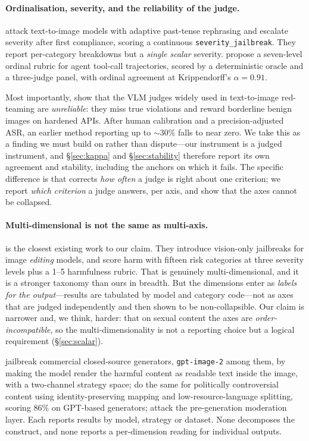 \documentclass[11pt]{article}
\begin{document}
\paragraph{Ordinalisation, severity, and the reliability of the judge.}
\citet{past2harm} attack text-to-image models with adaptive past-tense
rephrasing and escalate severity after first compliance, scoring a continuous
\texttt{severity\_jailbreak}. They report per-category breakdowns but a
\emph{single scalar} severity. \citet{actiongraded} propose a seven-level
ordinal rubric for agent tool-call trajectories, scored by a deterministic
oracle and a three-judge panel, with ordinal agreement at Krippendorff's
$\alpha=0.91$.

Most importantly, \citet{rise} show that the VLM judges widely used in
text-to-image red-teaming are \emph{unreliable}: they miss true violations and
reward borderline benign images on hardened APIs. After human calibration and
a precision-adjusted ASR, an earlier method reporting up to ${\sim}30\%$ falls
to near zero. We take this as a finding we must build on rather than
dispute---our instrument is a judged instrument, and \S\ref{sec:kappa} and
\S\ref{sec:stability} therefore report its own agreement and stability,
including the anchors on which it fails. The specific difference is that
\citet{rise} corrects \emph{how often} a judge is right about one criterion;
we report \emph{which criterion} a judge answers, per axis, and show that the
axes cannot be collapsed.

\paragraph{Multi-dimensional is not the same as multi-axis.}
\citet{visualjailbreak} is the closest existing work to our claim.
They introduce vision-only jailbreaks for image \emph{editing} models, and
score harm with fifteen risk categories at three severity levels plus a
1--5 harmfulness rubric. That is genuinely multi-dimensional, and it is a
stronger taxonomy than ours in breadth. But the dimensions enter as
\emph{labels for the output}---results are tabulated by model and category
code---not as axes that are judged independently and then shown to be
non-collapsible. Our claim is narrower and, we think, harder: that on sexual
content the axes are \emph{order-incompatible}, so the multi-dimensionality is
not a reporting choice but a logical requirement (\S\ref{sec:scalar}).

\citet{typo} jailbreak commercial closed-source generators, \texttt{gpt-image-2}
among them, by making the model render the harmful content as readable text
inside the image, with a two-channel strategy space; \citet{pc2} do the same
for politically controversial content using identity-preserving mapping and
low-resource-language splitting, scoring 86\% on GPT-based generators;
\citet{mirage} attack the pre-generation moderation layer. Each reports
results by model, strategy or dataset. None decomposes the construct, and none
reports a per-dimension reading for individual outputs.
\end{document}
